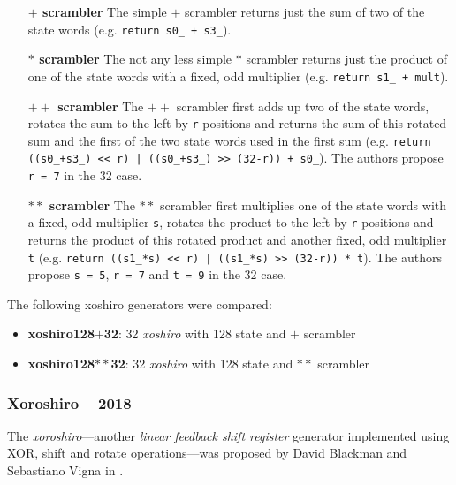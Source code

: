     \begin{itemize}
        \itemsep0em
        \item[\textbf{$\mathbf{+}$ scrambler}]  The simple $\mathbf{+}$ scrambler returns just the sum of two of the state words (e.g. \lstinline|return s0_ + s3_|).
        \item[\textbf{$\mathbf{*}$ scrambler}]  The not any less simple $\mathbf{*}$ scrambler returns just the product of one of the state words with a fixed, odd multiplier (e.g. \lstinline|return s1_ + mult|).
        \item[\textbf{$\mathbf{++}$ scrambler}] The $\mathbf{++}$ scrambler first adds up two of the state words, rotates the sum to the left by \lstinline|r| positions and returns the sum of this rotated sum and the first of the two state words used in the first sum (e.g. \lstinline{return ((s0_+s3_) << r) | ((s0_+s3_) >> (32-r)) + s0_}). The authors propose \lstinline|r = 7| in the \SI{32}{\bit} case.
        \item[\textbf{$\mathbf{**}$ scrambler}] The $\mathbf{**}$ scrambler first multiplies one of the state words with a fixed, odd multiplier \lstinline|s|, rotates the product to the left by \lstinline|r| positions and returns the product of this rotated product and another fixed, odd multiplier \lstinline|t| (e.g. \lstinline{return ((s1_*s) << r) | ((s1_*s) >> (32-r)) * t}). The authors propose \lstinline|s = 5|, \lstinline|r = 7| and \lstinline|t = 9| in the \SI{32}{\bit} case.
    \end{itemize}

    The following xoshiro generators were compared:
    \begin{itemize}
        \itemsep0em
        \item \textbf{xoshiro128$\mathbf{+}$32}: \SI{32}{\bit} \emph{xoshiro} with \SI{128}{\bit} state and $\mathbf{+}$ scrambler
        \item \textbf{xoshiro128$\mathbf{**}$32}: \SI{32}{\bit} \emph{xoshiro} with \SI{128}{\bit} state and $\mathbf{**}$ scrambler
    \end{itemize}

\subsubsection[Xoroshiro -- 2018]{Xoroshiro -- 2018} \label{subsubsec:xoroshiro}

    The \emph{xoroshiro}---another \emph{linear feedback shift register} generator implemented using XOR, shift and rotate operations---was proposed by David Blackman and Sebastiano Vigna in \cite{Blackman:2018}.

